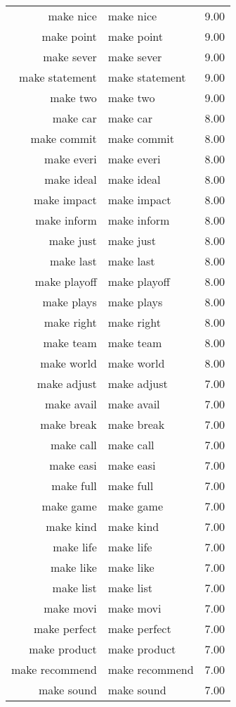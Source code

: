 \begin{table}[ht]
\begin{tabular}{rlr}
  make nice & make nice & 9.00 \\ 
  make point & make point & 9.00 \\ 
  make sever & make sever & 9.00 \\ 
  make statement & make statement & 9.00 \\ 
  make two & make two & 9.00 \\ 
  make car & make car & 8.00 \\ 
  make commit & make commit & 8.00 \\ 
  make everi & make everi & 8.00 \\ 
  make ideal & make ideal & 8.00 \\ 
  make impact & make impact & 8.00 \\ 
  make inform & make inform & 8.00 \\ 
  make just & make just & 8.00 \\ 
  make last & make last & 8.00 \\ 
  make playoff & make playoff & 8.00 \\ 
  make plays & make plays & 8.00 \\ 
  make right & make right & 8.00 \\ 
  make team & make team & 8.00 \\ 
  make world & make world & 8.00 \\ 
  make adjust & make adjust & 7.00 \\ 
  make avail & make avail & 7.00 \\ 
  make break & make break & 7.00 \\ 
  make call & make call & 7.00 \\ 
  make easi & make easi & 7.00 \\ 
  make full & make full & 7.00 \\ 
  make game & make game & 7.00 \\ 
  make kind & make kind & 7.00 \\ 
  make life & make life & 7.00 \\ 
  make like & make like & 7.00 \\ 
  make list & make list & 7.00 \\ 
  make movi & make movi & 7.00 \\ 
  make perfect & make perfect & 7.00 \\ 
  make product & make product & 7.00 \\ 
  make recommend & make recommend & 7.00 \\ 
  make sound & make sound & 7.00 \\ 

\end{tabular}
\end{table}
